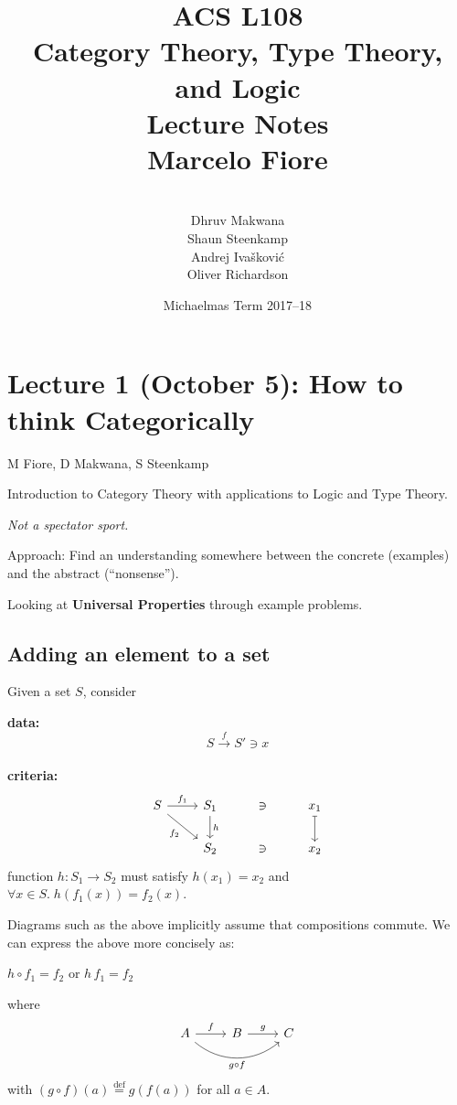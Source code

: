\documentclass[a4paper, 12pt]{article}
\title{ACS L108\\
  Category Theory, Type Theory, and Logic\\
  Lecture Notes\\[4mm]
  \Large Marcelo Fiore}
\author{\mbox{}\\[-8mm]Dhruv Makwana\\ 
  Shaun Steenkamp\\
  Andrej Ivašković\\
  Oliver Richardson}
\date{Michaelmas Term 2017--18}
\theoremstyle{definition}
\newcommand{\eqdef}{\stackrel{\text{def}}{=}} %
\newcommand{\comp}{\circ} %
\newcommand{\icomp}{\,} %
\begin{document}
\maketitle

\tableofcontents

\newpage
\section{Lecture 1 (October 5): How to think Categorically}
\vspace*{-5mm}\hspace*{7.75mm}
M Fiore, D Makwana, S Steenkamp
\bigskip

Introduction to Category Theory with applications to Logic and Type Theory.

\emph{Not a spectator sport.}

Approach: Find an understanding somewhere between the concrete (examples) and
the abstract (``nonsense'').

Looking at \textbf{Universal Properties} through example problems.

\subsection{Adding an element to a set}
\label{add-element-set}

Given a set $S$, consider

\textbf{data:} $$ S \overset{f}{\rightarrow} S' \ni x $$ \\
\textbf{criteria:} $$
    \begin{tikzcd}
        S \arrow[r, "f_1"]
          \arrow[dr, swap, "f_2"]
          &
        S_1 \arrow[d, "h"] & \ni & x_1 \arrow[d, mapsto]
          \\
          {}&
        S_2 & \ni & x_2
    \end{tikzcd}
$$
\quad function $h : S_1 \rightarrow S_2$ must satisfy $h(x_1) = x_2$ and 
$\forall x \in S .\; h(f_1(x)) = f_2(x)$.

\begin{framed}
Diagrams such as the above implicitly assume that compositions commute.  We
can express the above more concisely as:
\begin{center}
$h\comp f_1 = f_2$
\quad or \quad
$h\icomp f_1 = f_2$
\end{center}
where 
$$
\begin{tikzcd}
    A \arrow[r, "f"] \arrow[rr, swap, bend right=40, "g \circ f"] & B \arrow[r, "g"] & C
\end{tikzcd}
$$
with $(g\comp f)(a)\eqdef g(f(a))$ for all $a\in A$.
\end{framed}
\end{document}
